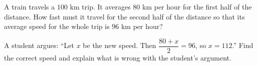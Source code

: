 A train travels a $100$ km trip. It averages $80$ km per hour for the first half of the distance. How fast must it travel for the second half of the distance so that its average speed for the whole trip is $96$ km per hour?

A student argues: ``Let $x$ be the new speed. Then $\dfrac{80+x}{2}=96$, so $x=112$.'' Find the correct speed and explain what is wrong with the student's argument.
